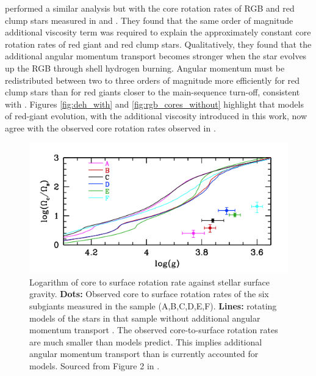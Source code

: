 \citet{moyano_asteroseismology_2022} performed a similar analysis but with the core rotation rates of RGB and red clump stars measured in \citet{mosser_spin_2012} and \citet{gehan_core_2018}.
They found that the same order of magnitude additional viscosity term was required to explain the approximately constant core rotation rates of red giant and red clump stars.  
Qualitatively, they found that the additional angular momentum transport becomes stronger when the star evolves up the RGB through shell hydrogen burning.
Angular momentum must be redistributed between two to three orders of
magnitude more efficiently for red clump stars than for red giants closer to the main-sequence turn-off, consistent with \citet{den_hartogh_constraining_2019}.
Figures \ref{fig:deh_with} and \ref{fig:rgb_cores_without}  highlight that models of red-giant evolution, with the additional viscosity introduced in this work, now agree with the observed core rotation rates observed in \citet{gehan_core_2018}.

\begin{figure}[h]
    \includegraphics[width=\textwidth]{Figures/intro_figures/deheuvels_disparity_without.png}
    \caption[A comparison of modelled and observed core to surface rotation rate ratios of post-main-sequence stars without additional angular momentum transport.]{Logarithm of core to surface rotation rate against stellar surface gravity. 
    \textbf{Dots:} Observed core to surface rotation rates of the six subgiants measured in the \citet{deheuvels_seismic_2014} sample (A,B,C,D,E,F).
    \textbf{Lines:} rotating models of the stars in that sample without additional angular momentum transport \citep{eggenberger_asteroseismology_2019}.
    The observed core-to-surface rotation rates are much smaller than models predict. This implies additional angular momentum transport than is currently accounted for models.
    Sourced from Figure 2 in \citet{eggenberger_asteroseismology_2019}.}
    \label{fig:deh_without}
\end{figure}

